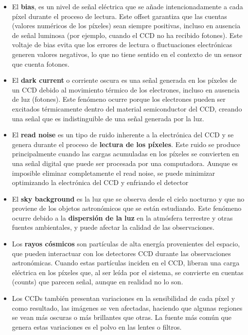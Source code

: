 \begin{itemize}
  \item El \textbf{bias}, es un nivel de señal eléctrica que se añade intencionadamente a cada píxel durante el proceso de lectura. Este offset garantiza que las cuentas (valores numéricos de los píxeles) sean siempre positivas, incluso en ausencia de señal luminosa (por ejemplo, cuando el CCD no ha recibido fotones). Este voltaje de bias evita que los errores de lectura o fluctuaciones electrónicas generen valores negativos, lo que no tiene sentido en el contexto de un sensor que cuenta fotones.

  \item El \textbf{dark current} o corriente oscura es una señal generada en los píxeles de un CCD debido al movimiento térmico de los electrones, incluso en ausencia de luz (fotones). Este fenómeno ocurre porque los electrones pueden ser excitados térmicamente dentro del material semiconductor del CCD, creando una señal que es indistinguible de una señal generada por la luz.
  
  \item El \textbf{read noise} es un tipo de ruido inherente a la electrónica del CCD y se genera durante el proceso de \textbf{lectura de los píxeles}. Este ruido se produce principalmente cuando las cargas acumuladas en los píxeles se convierten en una señal digital que puede ser procesada por una computadora. Aunque es imposible eliminar completamente el read noise, se puede minimizar optimizando la electrónica del CCD y enfriando el detector
  
  \item El \textbf{sky background} es la luz que se observa desde el cielo nocturno y que no proviene de los objetos astronómicos que se están estudiando. Este fenómeno ocurre debido a la \textbf{dispersión de la luz} en la atmósfera terrestre y otras fuentes ambientales, y puede afectar la calidad de las observaciones.
  
  \item Los \textbf{rayos cósmicos} son partículas de alta energía provenientes del espacio, que pueden interactuar con los detectores CCD durante las observaciones astronómicas. Cuando estas partículas inciden en el CCD, liberan una carga eléctrica en los píxeles que, al ser leída por el sistema, se convierte en cuentas (counts) que parecen señal, aunque en realidad no lo son.
  
  \item Los CCDs también presentan variaciones en la sensibilidad de cada píxel y como resultado, las imágenes se ven afectadas, haciendo que algunas regiones se vean más oscuras o más brillantes que otras. La fuente más común que genera estas variaciones es el polvo en las lentes o filtros. 
\end{itemize}

